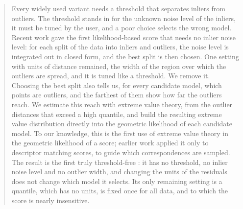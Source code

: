 \begin{abstract}
	Every widely used \ransac variant needs a threshold that separates
	inliers from outliers. The threshold stands in for the unknown noise
	level of the inliers, it must be tuned by the user, and a poor choice
	selects the wrong model. Recent work gave the first likelihood-based
	\ransac score that needs no inlier noise level: for each split of the data
	into inliers and outliers, the noise level is integrated out in closed
	form, and the best split is then chosen. One setting with units of
	distance remained, the width of the region over which the outliers are
	spread, and it is tuned like a threshold. We remove it. Choosing the best
	split also tells us, for every candidate model, which points are outliers,
	and the farthest of them show how far the outliers reach. We estimate this
	reach with extreme value theory, from the outlier distances that exceed a
	high quantile, and build the resulting extreme value distribution
	directly into the geometric likelihood of each candidate model. To our
	knowledge, this is the first use of extreme value theory in the
	geometric likelihood of a \ransac score; earlier work applied it only to
	descriptor matching scores, to guide which correspondences are sampled. The result is the first truly threshold-free \ransac: it
	has no threshold, no inlier noise level and no outlier width, and changing
	the units of the residuals does not change which model it selects. Its
	only remaining setting is a quantile, which has no units, is fixed once
	for all data, and to which the score is nearly insensitive.
\end{abstract}
